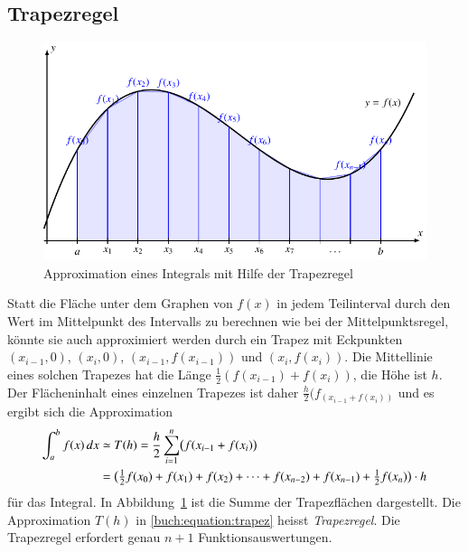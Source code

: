 \subsection{Trapezregel
\label{buch:subsection:trapez}}
\begin{figure}
\centering
\includegraphics{chapters/40-integration/figures/trapez.pdf}
\caption{Approximation eines Integrals mit Hilfe der Trapezregel
\label{buch:figure:trapez}}
\end{figure}
Statt die Fläche unter dem Graphen von $f(x)$ in jedem Teilinterval
durch den Wert im Mittelpunkt des Intervalls zu berechnen wie bei der
Mittelpunktsregel, könnte sie auch approximiert werden durch ein
Trapez mit Eckpunkten $(x_{i-1},0)$, $(x_i,0)$,
$(x_{i-1},f(x_{i-1}))$ und
$(x_i,f(x_i))$.
Die Mittellinie eines solchen Trapezes hat die Länge
$\frac12(f(x_{i-1}) +f(x_i))$, die Höhe ist $h$.
Der Flächeninhalt eines einzelnen Trapezes ist daher
$\frac{h}2(f_(x_{i-1}+f(x_i))$ und es ergibt sich die Approximation
\begin{align}
\int_a^b
f(x)\,dx
&\simeq
T(h)
=
\frac{h}2
\sum_{i=1}^n \bigl(f(x_{i-1} + f(x_i)\bigr)
\notag
\\
&=
\bigl(
{\textstyle\frac12}f(x_0) + f(x_1) + f(x_2)
+ \dots
+ f(x_{n-2}) + f(x_{n-1}) + {\textstyle\frac12} f(x_n)
\bigr)\cdot h
\label{buch:equation:trapez}
\end{align}
für das Integral.
In Abbildung~\ref{buch:figure:trapez} ist die Summe der Trapezflächen 
dargestellt.
Die Approximation $T(h)$ in \eqref{buch:equation:trapez} heisst
{\em Trapezregel}.
%
Die Trapezregel erfordert genau $n+1$ Funktionsauswertungen.

